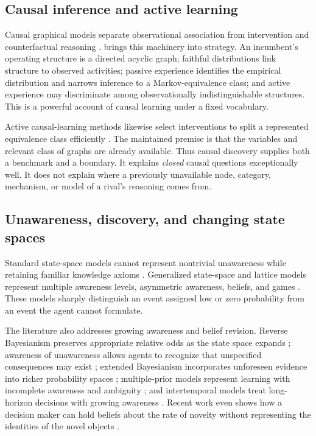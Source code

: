 \documentclass[11pt]{article}
\begin{document}
	\subsection{Causal inference and active learning}
	
	Causal graphical models separate observational association from intervention and counterfactual reasoning \citep{Pearl2009,SpirtesEtAl2000}.  \citet{Ryall2009} brings this machinery into strategy.  An incumbent's operating structure is a directed acyclic graph; faithful distributions link structure to observed activities; passive experience identifies the empirical distribution and narrows inference to a Markov-equivalence class; and active experience may discriminate among observationally indistinguishable structures.  This is a powerful account of causal learning under a fixed vocabulary.
	
	Active causal-learning methods likewise select interventions to split a represented equivalence class efficiently \citep{HeGeng2008}.  The maintained premise is that the variables and relevant class of graphs are already available.  Thus causal discovery supplies both a benchmark and a boundary.  It explains \emph{closed} causal questions exceptionally well.  It does not explain where a previously unavailable node, category, mechanism, or model of a rival's reasoning comes from.
	
	\subsection{Unawareness, discovery, and changing state spaces}
	
	Standard state-space models cannot represent nontrivial unawareness while retaining familiar knowledge axioms \citep{DekelLipmanRustichini1998}.  Generalized state-space and lattice models represent multiple awareness levels, asymmetric awareness, beliefs, and games \citep{HeifetzMeierSchipper2006,HeifetzMeierSchipper2013}.  These models sharply distinguish an event assigned low or zero probability from an event the agent cannot formulate.
	
	The literature also addresses growing awareness and belief revision.  Reverse Bayesianism preserves appropriate relative odds as the state space expands \citep{KarniViero2013}; awareness of unawareness allows agents to recognize that unspecified consequences may exist \citep{KarniViero2017}; extended Bayesianism incorporates unforeseen evidence into richer probability spaces \citep{Piermont2021}; multiple-prior models represent learning with incomplete awareness and ambiguity \citep{GrantMeneghelTourky2022}; and intertemporal models treat long-horizon decisions with growing awareness \citep{Viero2021}.  Recent work even shows how a decision maker can hold beliefs about the rate of novelty without representing the identities of the novel objects \citep{Schipper2025}.
	
\end{document}

